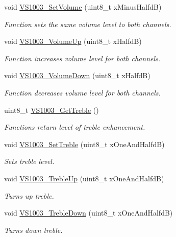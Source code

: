 \begin{DoxyCompactItemize}
\item 
void \hyperlink{group___v_s1003_gad9b32a2a7d63b711fc17d148604e3eab}{VS1003\_\-SetVolume} (uint8\_\-t xMinusHalfdB)
\begin{DoxyCompactList}\small\item\em Function sets the same volume level to both channels. \end{DoxyCompactList}\item 
void \hyperlink{group___v_s1003_ga4f95ce5237dcdc657dfa89517aab0cb9}{VS1003\_\-VolumeUp} (uint8\_\-t xHalfdB)
\begin{DoxyCompactList}\small\item\em Function increases volume level for both channels. \end{DoxyCompactList}\item 
void \hyperlink{group___v_s1003_gae47ed2e7d38334207d3b82e228a0d499}{VS1003\_\-VolumeDown} (uint8\_\-t xHalfdB)
\begin{DoxyCompactList}\small\item\em Function decreases volume level for both channels. \end{DoxyCompactList}\item 
uint8\_\-t \hyperlink{group___v_s1003_ga82d6c7066995fa8e0f395086189c8ac4}{VS1003\_\-GetTreble} ()
\begin{DoxyCompactList}\small\item\em Functions return level of treble enhancement. \end{DoxyCompactList}\item 
void \hyperlink{group___v_s1003_gaf1911e05279d10489cc24fa01c247ef9}{VS1003\_\-SetTreble} (uint8\_\-t xOneAndHalfdB)
\begin{DoxyCompactList}\small\item\em Sets treble level. \end{DoxyCompactList}\item 
void \hyperlink{group___v_s1003_ga417954b454482b4df25b52532671e59e}{VS1003\_\-TrebleUp} (uint8\_\-t xOneAndHalfdB)
\begin{DoxyCompactList}\small\item\em Turns up treble. \end{DoxyCompactList}\item 
void \hyperlink{group___v_s1003_ga43bb27c62418f64554a40effe99f8de0}{VS1003\_\-TrebleDown} (uint8\_\-t xOneAndHalfdB)
\begin{DoxyCompactList}\small\item\em Turns down treble. \end{DoxyCompactList}\item 

\end{DoxyCompactItemize}
